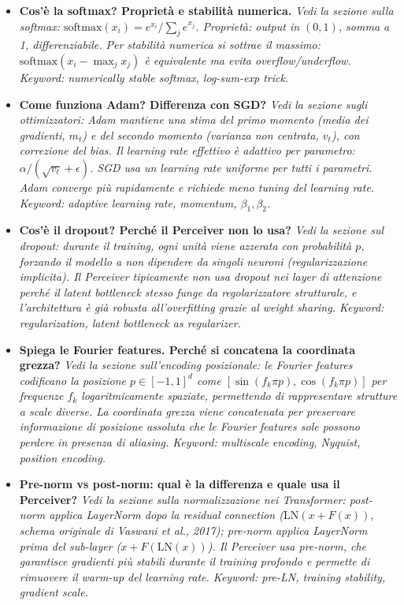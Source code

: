 \documentclass[
  11pt,
]{article}
\begin{document}
\begin{itemize}
  \item \textbf{Cos'è la softmax? Proprietà e stabilità numerica.}
  \textit{Vedi la sezione sulla softmax: $\text{softmax}(x_i) = e^{x_i}/\sum_j e^{x_j}$. Proprietà: output in $(0,1)$, somma a 1, differenziabile. Per stabilità numerica si sottrae il massimo: $\text{softmax}(x_i - \max_j x_j)$ è equivalente ma evita overflow/underflow. Keyword: numerically stable softmax, log-sum-exp trick.}

  \item \textbf{Come funziona Adam? Differenza con SGD?}
  \textit{Vedi la sezione sugli ottimizzatori: Adam mantiene una stima del primo momento (media dei gradienti, $m_t$) e del secondo momento (varianza non centrata, $v_t$), con correzione del bias. Il learning rate effettivo è adattivo per parametro: $\alpha / (\sqrt{v_t} + \epsilon)$. SGD usa un learning rate uniforme per tutti i parametri. Adam converge più rapidamente e richiede meno tuning del learning rate. Keyword: adaptive learning rate, momentum, $\beta_1, \beta_2$.}

  \item \textbf{Cos'è il dropout? Perché il Perceiver non lo usa?}
  \textit{Vedi la sezione sul dropout: durante il training, ogni unità viene azzerata con probabilità $p$, forzando il modello a non dipendere da singoli neuroni (regularizzazione implicita). Il Perceiver tipicamente non usa dropout nei layer di attenzione perché il latent bottleneck stesso funge da regolarizzatore strutturale, e l'architettura è già robusta all'overfitting grazie al weight sharing. Keyword: regularization, latent bottleneck as regularizer.}

  \item \textbf{Spiega le Fourier features. Perché si concatena la coordinata grezza?}
  \textit{Vedi la sezione sull'encoding posizionale: le Fourier features codificano la posizione $p \in [-1,1]^d$ come $[\sin(f_k \pi p), \cos(f_k \pi p)]$ per frequenze $f_k$ logaritmicamente spaziate, permettendo di rappresentare strutture a scale diverse. La coordinata grezza viene concatenata per preservare informazione di posizione assoluta che le Fourier features sole possono perdere in presenza di aliasing. Keyword: multiscale encoding, Nyquist, position encoding.}

  \item \textbf{Pre-norm vs post-norm: qual è la differenza e quale usa il Perceiver?}
  \textit{Vedi la sezione sulla normalizzazione nei Transformer: post-norm applica LayerNorm \emph{dopo} la residual connection ($\text{LN}(x + F(x))$, schema originale di Vaswani et al., 2017); pre-norm applica LayerNorm \emph{prima} del sub-layer ($x + F(\text{LN}(x))$). Il Perceiver usa pre-norm, che garantisce gradienti più stabili durante il training profondo e permette di rimuovere il warm-up del learning rate. Keyword: pre-LN, training stability, gradient scale.}

\end{itemize}
\end{document}
